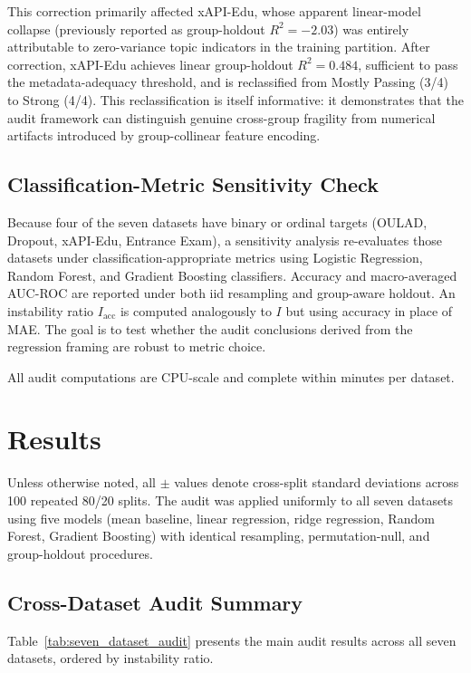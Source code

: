 \documentclass[10pt,letterpaper]{wlscirep}
\begin{document}
This correction primarily affected xAPI-Edu, whose apparent linear-model collapse (previously reported as group-holdout $R^2 = -2.03$) was entirely attributable to zero-variance topic indicators in the training partition. After correction, xAPI-Edu achieves linear group-holdout $R^2 = 0.484$, sufficient to pass the metadata-adequacy threshold, and is reclassified from Mostly Passing (3/4) to Strong (4/4). This reclassification is itself informative: it demonstrates that the audit framework can distinguish genuine cross-group fragility from numerical artifacts introduced by group-collinear feature encoding.

\subsection{Classification-Metric Sensitivity Check}
\label{sec:class_sensitivity}
Because four of the seven datasets have binary or ordinal targets (OULAD, Dropout, xAPI-Edu, Entrance Exam), a sensitivity analysis re-evaluates those datasets under classification-appropriate metrics using Logistic Regression, Random Forest, and Gradient Boosting classifiers. Accuracy and macro-averaged AUC-ROC are reported under both iid resampling and group-aware holdout. An instability ratio $I_{\mathrm{acc}}$ is computed analogously to $I$ but using accuracy in place of MAE. The goal is to test whether the audit conclusions derived from the regression framing are robust to metric choice.

All audit computations are CPU-scale and complete within minutes per dataset.

\section{Results}

Unless otherwise noted, all $\pm$ values denote cross-split standard deviations across 100 repeated 80/20 splits. The audit was applied uniformly to all seven datasets using five models (mean baseline, linear regression, ridge regression, Random Forest, Gradient Boosting) with identical resampling, permutation-null, and group-holdout procedures.

\subsection{Cross-Dataset Audit Summary}

Table~\ref{tab:seven_dataset_audit} presents the main audit results across all seven datasets, ordered by instability ratio.
\end{document}
